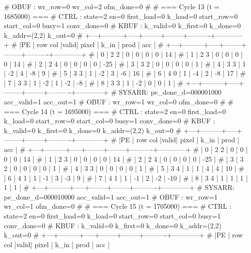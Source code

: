 # OBUF : wr_row=0 wr_col=2 ofm_done=0
# 
# === Cycle 13  (t = 1685000) ===
# CTRL : state=2 en=0 first_load=0 k_load=0 start_row=0 start_col=0 busy=1 conv_done=0
# KBUF : k_valid=0 k_first=0 k_done=0 k_addr=(2,2) k_out=0
# +---+---------+-----+--------+--------+----------+------------+
# |PE | row col |valid| pixel  |  k_in  |   prod   |    acc     |
# +---+---------+-----+--------+--------+----------+------------+
# | 0 |   2   2 |  0  |      0 |      0 |        0 |         14 |
# | 1 |   2   3 |  0  |      0 |      0 |        0 |         14 |
# | 2 |   2   4 |  0  |      0 |      0 |        0 |        -25 |
# | 3 |   3   2 |  0  |      0 |      0 |        0 |          1 |
# | 4 |   3   3 |  1  |     -2 |      4 |       -8 |          9 |
# | 5 |   3   3 |  1  |     -2 |      3 |       -6 |         16 |
# | 6 |   4   0 |  1  |     -4 |      2 |       -8 |         17 |
# | 7 |   3   3 |  1  |     -2 |      1 |       -2 |         -8 |
# | 8 |   3   3 |  1  |     -2 |      0 |        0 |          1 |
# +---+---------+-----+--------+--------+----------+------------+
# SYSARR: pe_done_d=000001000 acc_valid=1 acc_out=1
# OBUF : wr_row=1 wr_col=0 ofm_done=0
# 
# === Cycle 14  (t = 1695000) ===
# CTRL : state=2 en=0 first_load=0 k_load=0 start_row=0 start_col=0 busy=1 conv_done=0
# KBUF : k_valid=0 k_first=0 k_done=0 k_addr=(2,2) k_out=0
# +---+---------+-----+--------+--------+----------+------------+
# |PE | row col |valid| pixel  |  k_in  |   prod   |    acc     |
# +---+---------+-----+--------+--------+----------+------------+
# | 0 |   2   2 |  0  |      0 |      0 |        0 |         14 |
# | 1 |   2   3 |  0  |      0 |      0 |        0 |         14 |
# | 2 |   2   4 |  0  |      0 |      0 |        0 |        -25 |
# | 3 |   3   2 |  0  |      0 |      0 |        0 |          1 |
# | 4 |   3   3 |  0  |      0 |      0 |        0 |          1 |
# | 5 |   3   4 |  1  |      1 |      4 |        4 |         10 |
# | 6 |   4   1 |  1  |     -1 |      3 |       -3 |          9 |
# | 7 |   4   1 |  1  |     -1 |      2 |       -2 |        -10 |
# | 8 |   3   4 |  1  |      1 |      1 |        1 |          1 |
# +---+---------+-----+--------+--------+----------+------------+
# SYSARR: pe_done_d=000010000 acc_valid=1 acc_out=1
# OBUF : wr_row=1 wr_col=1 ofm_done=0
# 
# === Cycle 15  (t = 1705000) ===
# CTRL : state=2 en=0 first_load=0 k_load=0 start_row=0 start_col=0 busy=1 conv_done=0
# KBUF : k_valid=0 k_first=0 k_done=0 k_addr=(2,2) k_out=0
# +---+---------+-----+--------+--------+----------+------------+
# |PE | row col |valid| pixel  |  k_in  |   prod   |    acc     |
